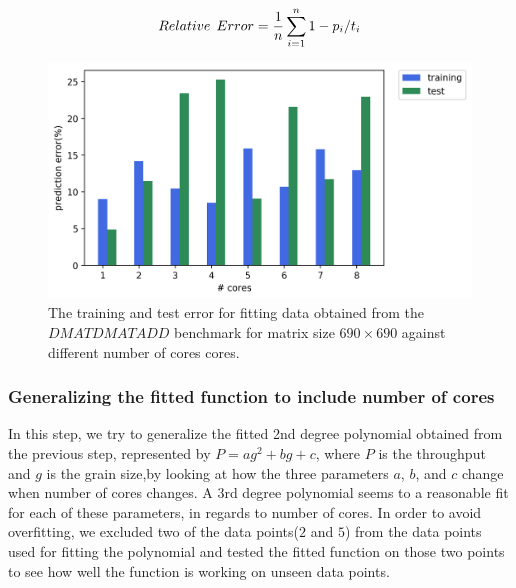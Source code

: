 \begin{equation}{\label{eq2}}
Relative\:\:Error = \frac{1}{n}\sum_{i=1}^{n} {1-p_i/t_i}
\end{equation}

\vspace{\baselineskip}	
\begin{figure}[H]
	\centering
	\includegraphics[scale=.75]{images/polyfit/fig_train_test_690.png}
	\caption{The training and test error for fitting data obtained from the $DMATDMATADD$ benchmark for matrix size $690\times690$ against different number of cores cores.}	
	\label{fig11}
\end{figure}

\vspace{\baselineskip}	
\subsubsection{Generalizing the fitted function to include number of cores}
In this step, we try to generalize the fitted 2nd degree polynomial obtained from the previous step, represented by $P=ag^2+bg+c$, where $P$ is the throughput and $g$ is the grain size,by looking at how the three parameters $a$, $b$, and $c$ change when number of cores changes. 
A $3$rd degree polynomial seems to a reasonable fit for each of these parameters, in regards to number of cores. In order to avoid overfitting, we excluded two of the data points($2$ and $5$) from the data points used for fitting the polynomial and tested the fitted function on those two points to see how well the function is working on unseen data points. 


